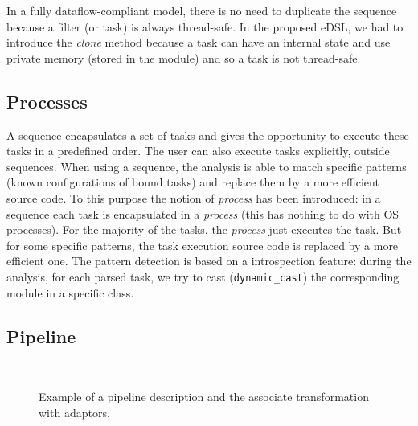 In a fully dataflow-compliant model, there is no need to duplicate the sequence
because a filter (or task) is always thread-safe. In the proposed eDSL, we had
to introduce the \emph{clone} method because a task can have an internal state
and use private memory (stored in the module) and so a task is not thread-safe.

\subsection{Processes}

A sequence encapsulates a set of tasks and gives the opportunity to execute
these tasks in a predefined order. The user can also execute tasks explicitly,
outside sequences. When using a sequence, the analysis is able to match specific
patterns (known configurations of bound tasks) and replace them by a more
efficient source code. To this purpose the notion of \emph{process} has been
introduced: in a sequence each task is encapsulated in a \emph{process} (this
has nothing to do with OS processes). For the majority of the tasks, the
\emph{process} just executes the task. But for some specific patterns, the task
execution source code is replaced by a more efficient one. The pattern detection
is based on a \Cxx introspection feature: during the analysis, for each parsed
task, we try to cast (\verb|dynamic_cast|) the corresponding module in a
specific class.

\subsection{Pipeline}

\begin{figure}[htp]
  \centering
  \\
  \caption{Example of a pipeline description and the associate transformation
    with adaptors.}
  \label{fig:dsl_pipeline}
\end{figure}

\begin{listing}[htp]
  \inputminted[frame=lines,linenos]{C++}{main/chapter6/src/pipeline/pipeline.cpp}
  \caption{\AFFECT \Cxx eDSL source code of the pipeline described in
    Fig.~\ref{fig:dsl_pipeline}.}
  \label{lst:dsl_pipeline}
\end{listing}


